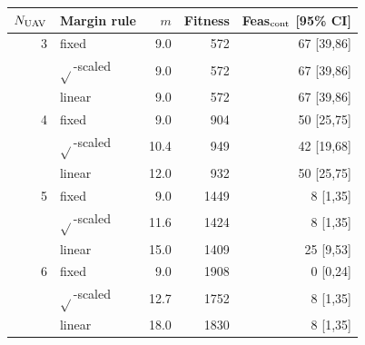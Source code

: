 \begin{tabular}{rlrrr}
\hline
$N_{\rm UAV}$ & Margin rule & $m$ & Fitness & Feas$_{\rm cont}$ [95\% CI] \\
\hline
3 & fixed & 9.0 & 572 & 67 [39,86] \\
 & $\sqrt{}$-scaled & 9.0 & 572 & 67 [39,86] \\
 & linear & 9.0 & 572 & 67 [39,86] \\
\hline
4 & fixed & 9.0 & 904 & 50 [25,75] \\
 & $\sqrt{}$-scaled & 10.4 & 949 & 42 [19,68] \\
 & linear & 12.0 & 932 & 50 [25,75] \\
\hline
5 & fixed & 9.0 & 1449 & 8 [1,35] \\
 & $\sqrt{}$-scaled & 11.6 & 1424 & 8 [1,35] \\
 & linear & 15.0 & 1409 & 25 [9,53] \\
\hline
6 & fixed & 9.0 & 1908 & 0 [0,24] \\
 & $\sqrt{}$-scaled & 12.7 & 1752 & 8 [1,35] \\
 & linear & 18.0 & 1830 & 8 [1,35] \\
\hline
\end{tabular}